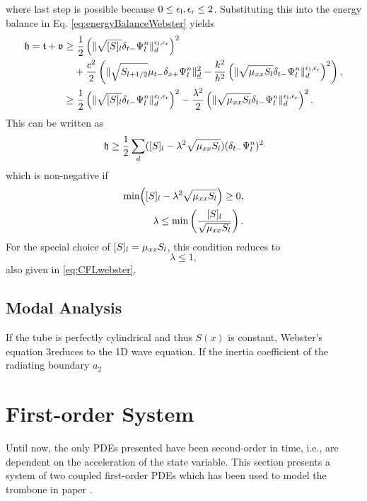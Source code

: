 {where last step is possible because $0\leq \epsilon_\text{l}, \epsilon_\text{r} \leq 2$.
Substituting this into the energy balance in Eq. \eqref{eq:energyBalanceWebster} yields
\begin{align*}
    \mathfrak{h} = \mathfrak{t} + \mathfrak{v} \geq &\  \frac{1}{2} \left(\lVert\sqrt{[S]_l} \delta_{t-} \Psi_l^n \rVert_d^{\epsilon_\text{l}, \epsilon_\text{r}}\right)^2 \\
    &+ \frac{c^2}{2}\left(\lVert\sqrt{S_{l+1/2}}\mu_{t-}\delta_{x+}\Psi_l^n\rVert_{\underline{d}}^2 - \frac{k^2}{h^2}\left(\lVert\sqrt{\mu_{xx} S_l}\delta_{t-}\Psi_l^n\rVert_{d}^{\epsilon_\text{l},\epsilon_\text{r}}\right)^2\right),\\
    \geq &\ \frac{1}{2} \left(\lVert\sqrt{[S]_l} \delta_{t-} \Psi_l^n \rVert_d^{\epsilon_\text{l}, \epsilon_\text{r}}\right)^2- \frac{\lambda^2}{2}\left(\lVert\sqrt{\mu_{xx} S_l}\delta_{t-}\Psi_l^n\rVert_{d}^{\epsilon_\text{l},\epsilon_\text{r}}\right)^2.
\end{align*}
This can be written as
\begin{equation}
    \mathfrak{h} \geq \frac{1}{2} \sum_d ([S]_l - \lambda^2\sqrt{\mu_{xx} S_l})(\delta_{t-} \Psi_l^n)^2 
\end{equation}
which is non-negative if
\begin{align*}
    \text{min}\Big([S]_l - \lambda^2\sqrt{\mu_{xx} S_l}\Big) \geq 0,\\
    \lambda \leq \text{min}\left(\frac{[S]_l}{\sqrt{\mu_{xx} S_l}}\right).
\end{align*}
For the special choice of $[S]_l = \mu_{xx} S_l$, this condition reduces to
\begin{equation}
    \lambda \leq 1,
\end{equation}
also given in \eqref{eq:CFLwebster}.

\subsection{Modal Analysis}
If the tube is perfectly cylindrical and thus $S(x)$ is constant, Webster's equation 3reduces to the 1D wave equation. If the inertia coefficient of the radiating boundary $a_2$

\section{First-order System}\label{sec:firstOrderSystem}
Until now, the only PDEs presented have been second-order in time, i.e., are dependent on the acceleration of the state variable. This section presents a system of two coupled first-order PDEs which has been used to model the trombone in paper \citeP[H].

}
